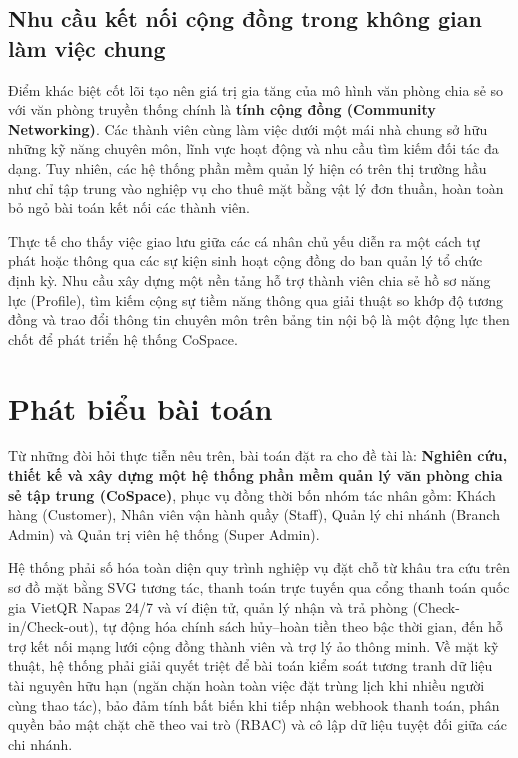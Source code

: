 \subsection{Nhu cầu kết nối cộng đồng trong không gian làm việc chung}
Điểm khác biệt cốt lõi tạo nên giá trị gia tăng của mô hình văn phòng chia sẻ so với văn phòng truyền thống chính là \textbf{tính cộng đồng (Community Networking)}. Các thành viên cùng làm việc dưới một mái nhà chung sở hữu những kỹ năng chuyên môn, lĩnh vực hoạt động và nhu cầu tìm kiếm đối tác đa dạng. Tuy nhiên, các hệ thống phần mềm quản lý hiện có trên thị trường hầu như chỉ tập trung vào nghiệp vụ cho thuê mặt bằng vật lý đơn thuần, hoàn toàn bỏ ngỏ bài toán kết nối các thành viên.

Thực tế cho thấy việc giao lưu giữa các cá nhân chủ yếu diễn ra một cách tự phát hoặc thông qua các sự kiện sinh hoạt cộng đồng do ban quản lý tổ chức định kỳ. Nhu cầu xây dựng một nền tảng hỗ trợ thành viên chia sẻ hồ sơ năng lực (Profile), tìm kiếm cộng sự tiềm năng thông qua giải thuật so khớp độ tương đồng và trao đổi thông tin chuyên môn trên bảng tin nội bộ là một động lực then chốt để phát triển hệ thống CoSpace.

\section{Phát biểu bài toán}
\label{sec:baitoan}

Từ những đòi hỏi thực tiễn nêu trên, bài toán đặt ra cho đề tài là: \textbf{Nghiên cứu, thiết kế và xây dựng một hệ thống phần mềm quản lý văn phòng chia sẻ tập trung (CoSpace)}, phục vụ đồng thời bốn nhóm tác nhân gồm: Khách hàng (Customer), Nhân viên vận hành quầy (Staff), Quản lý chi nhánh (Branch Admin) và Quản trị viên hệ thống (Super Admin). 

Hệ thống phải số hóa toàn diện quy trình nghiệp vụ đặt chỗ từ khâu tra cứu trên sơ đồ mặt bằng SVG tương tác, thanh toán trực tuyến qua cổng thanh toán quốc gia VietQR Napas 24/7 và ví điện tử, quản lý nhận và trả phòng (Check-in/Check-out), tự động hóa chính sách hủy--hoàn tiền theo bậc thời gian, đến hỗ trợ kết nối mạng lưới cộng đồng thành viên và trợ lý ảo thông minh. Về mặt kỹ thuật, hệ thống phải giải quyết triệt để bài toán kiểm soát tương tranh dữ liệu tài nguyên hữu hạn (ngăn chặn hoàn toàn việc đặt trùng lịch khi nhiều người cùng thao tác), bảo đảm tính bất biến khi tiếp nhận webhook thanh toán, phân quyền bảo mật chặt chẽ theo vai trò (RBAC) và cô lập dữ liệu tuyệt đối giữa các chi nhánh.

